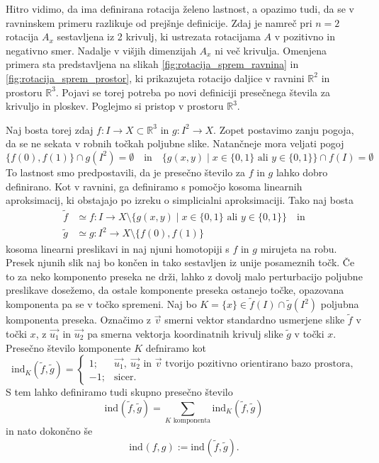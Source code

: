 \documentclass[mat1]{fmfdelo}
\newcommand{\R}{\mathbb R}
\newcommand{\ind}[3][]{\text{ind}_{#1}(#2, #3)}
\begin{document}
Hitro vidimo, da ima definirana rotacija želeno lastnost, a opazimo tudi, da se v ravninskem primeru razlikuje od prejšnje definicije. Zdaj je namreč pri $n=2$ rotacija $A_x$ sestavljena iz 2 krivulj, ki ustrezata rotacijama $A$ v pozitivno in negativno smer. Nadalje v višjih dimenzijah $A_x$ ni več krivulja. Omenjena primera sta predstavljena na slikah \ref{fig:rotacija_sprem_ravnina} in \ref{fig:rotacija_sprem_prostor}, ki prikazujeta rotacijo daljice v ravnini $\R^2$ in prostoru $\R^3$. Pojavi se torej potreba po novi definiciji presečnega števila za krivuljo in ploskev. Poglejmo si pristop v prostoru $\R^3$.

Naj bosta torej zdaj $f \colon I \to X \subset \R^3$ in $g \colon I^2 \to X$. Zopet postavimo zanju pogoja, da se ne sekata v robnih točkah poljubne slike. Natančneje mora veljati  pogoj
\begin{equation}\label{eq:razl_rob_prostor}
\{f(0), f(1)\} \cap g(I^2) = \emptyset \quad \text{in} \quad \{g(x, y) \mid x \in \{0, 1\} \text{ ali } y \in \{0, 1\} \} \cap f(I) = \emptyset
\end{equation}
To lastnost smo predpostavili, da je presečno število za $f$ in $g$ lahko dobro definirano. Kot v ravnini, ga definiramo s pomočjo kosoma linearnih aproksimacij, ki obstajajo po izreku o simplicialni aproksimaciji. Tako naj bosta 
\begin{align*}
\widetilde{f} &\simeq f \colon I \to X \setminus \{g(x, y) \mid x \in \{0, 1\} \text{ ali } y \in \{0, 1\} \} \quad \text{in}\\ 
\widetilde{g} &\simeq g\colon I^2 \to X \setminus \{f(0), f(1)\}
\end{align*}
kosoma linearni preslikavi in naj njuni homotopiji s $f$ in $g$ mirujeta na robu. Presek njunih slik naj bo končen in tako sestavljen iz unije posameznih točk. Če to za neko komponento preseka ne drži, lahko z dovolj malo perturbacijo poljubne preslikave dosežemo, da ostale komponente preseka ostanejo točke, opazovana komponenta pa se v točko spremeni. Naj bo $K = \{x\} \in \widetilde{f}(I) \cap \widetilde{g}(I^2)$ poljubna komponenta preseka. Označimo z $\overrightarrow{v}$ smerni vektor standardno usmerjene slike $\widetilde{f}$ v točki $x$, z $\overrightarrow{u_1}$ in $\overrightarrow{u_2}$ pa smerna vektorja koordinatnih krivulj slike $\widetilde{g}$ v točki $x$. Presečno število komponente $K$ defniramo kot
\begin{equation*}
\ind[K]{\widetilde{f}}{\widetilde{g}} = \begin{cases}
1; &\overrightarrow{u_1},\ \overrightarrow{u_2} \text{ in } \overrightarrow{v} \text{ tvorijo pozitivno orientirano bazo prostora,}\\
-1; &\text{sicer}.
\end{cases}
\end{equation*}
S tem lahko definiramo tudi skupno presečno število \[ \ind{\widetilde{f}}{\widetilde{g}} = \sum_{K \text{ komponenta}} \ind[K]{\widetilde{f}}{\widetilde{g}} \] in nato dokončno še \[ \ind{f}{g} := \ind{\widetilde{f}}{\widetilde{g}}. \]
\end{document}
